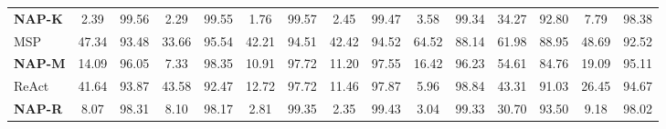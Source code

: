 \begin{table}[!h]
{\begin{tabular}{LcccccccccccccR}
\textbf{NAP-K}            & 2.39                      &      99.56                     & 2.29                      &      99.55                     & 1.76                      &      99.57                     & 2.45                      &      99.47                     & 3.58                      &      99.34                     & 34.27                     &      92.80                     & 7.79                      &      98.38                 \\ %
MSP                       & 47.34                     &      93.48                     & 33.66                     &      95.54                     & 42.21                     &      94.51                     & 42.42                     &      94.52                     & 64.52                     &      88.14                     & 61.98                     &      88.95                     & 48.69                     &      92.52                 \\
\textbf{NAP-M}            & 14.09                     &      96.05                     & 7.33                      &      98.35                     & 10.91                     &      97.72                     & 11.20                     &      97.55                     & 16.42                     &      96.23                     & 54.61                     &      84.76                     & 19.09                     &      95.11                 \\ %
ReAct                            & 41.64                     & 93.87                     & 43.58                     & 92.47                     & 12.72                     & 97.72                     & 11.46                     & 97.87                     & 5.96                      & 98.84                     & 43.31                     & 91.03                     & 26.45                     & 94.67                     \\
\textbf{NAP-R}            & 8.07                      & 98.31                     & 8.10                      & 98.17                     & 2.81                      & 99.35                     & 2.35                      & 99.43                     & 3.04                      & 99.33                     & 30.70                     & 93.50                     & 9.18                      & 98.02                    \\ \bottomrule
\end{tabular}
}
\end{table}

